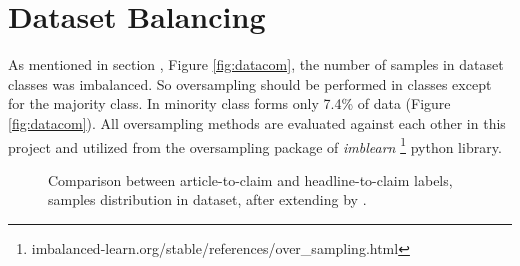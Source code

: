 \section{Dataset Balancing}
As mentioned in section , Figure \ref{fig:datacom}, the number of samples in dataset classes was imbalanced. So oversampling should be performed in classes except for the majority class.
In \cite{stance_persian} minority class forms only 7.4\% of data (Figure \ref{fig:datacom}).
 All oversampling methods are evaluated against each other in this project and utilized from the oversampling package of \textit{imblearn} \footnote{imbalanced-learn.org/stable/references/over\_sampling.html} python library. 

\begin{figure}%
	\centering
	\qquad
	\caption{Comparison between article-to-claim and headline-to-claim labels, samples distribution in \cite{stance_persian} dataset, after extending by \cite{parsfever} .}%
	\label{fig:datab1}%
\end{figure}




